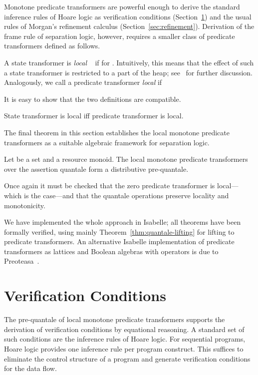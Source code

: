 \documentclass[twoside,runningheads,envcountsame,envcountsect,oribibl,orivec]{llncs}
\begin{document}
Monotone predicate transformers are powerful enough to derive the
standard inference rules of Hoare logic as verification conditions
(Section~\ref{sec:verification}) and the usual rules of Morgan's
refinement calculus (Section~\ref{sec:refinement}). Derivation of the
frame rule of separation logic, however, requires a smaller class of
predicate transformers defined as follows.

A state transformer  is \emph{local} ~\cite{COY07} if  for . Intuitively, this
means that the effect of such a state transformer is restricted to a
part of the heap; see~\cite{COY07} for further discussion.
Analogously, we call a predicate transformer  \emph{local} if

It is easy to show that the two definitions are compatible.
\begin{lemma}\label{lem:local-prop2}
  State transformer  is local iff predicate transformer
   is local.
\end{lemma}

The final theorem in this section establishes the local monotone
predicate transformers as a suitable algebraic framework for
separation logic.
\begin{theorem}\label{prop:pt-loc-quantale}
  Let  be a set and  a resource monoid. The local monotone
  predicate transformers over the assertion quantale
   form a distributive pre-quantale.
\end{theorem}
Once again it must be checked that the zero predicate transformer is
local---which is the case---and that the quantale operations preserve
locality and monotonicity.

We have implemented the whole approach in Isabelle; all theorems have
been formally verified, using mainly
Theorem~\ref{thm:quantale-lifting} for lifting to predicate
transformers. An alternative Isabelle implementation of predicate
transformers as lattices and Boolean algebras with operators is due to
Preoteasa~\cite{Preoteasa11}.



\section{Verification Conditions} \label{sec:verification}

The pre-quantale of local monotone predicate transformers supports the
derivation of verification conditions by equational reasoning. A
standard set of such conditions are the inference rules of Hoare
logic. For sequential programs, Hoare logic provides one inference
rule per program construct. This suffices to eliminate the control
structure of a program and generate verification conditions for the
data flow.
\end{document}
